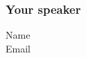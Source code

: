 \begin{frame}
  \frametitle{Your speaker}
  \begin{description}
  \item[Name] \UserName
  \item[Email] \UserEmail
  \end{description}
\end{frame}
